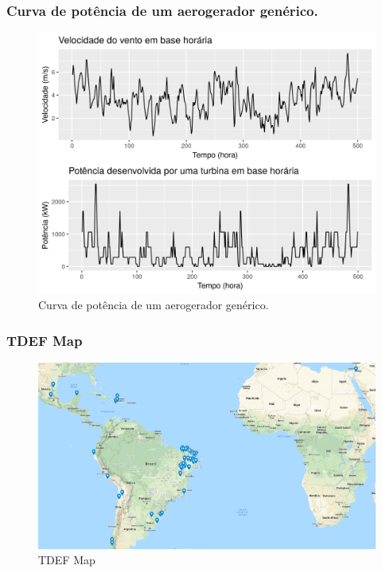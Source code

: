 \documentclass{beamer}
\begin{document}
\begin{frame}
	\frametitle{Curva de potência de um aerogerador genérico.}
	\begin{figure}
		\centering
		\includegraphics[width=\textwidth]{speed_power}
		\caption{Curva de potência de um aerogerador genérico.}
	\end{figure}
\end{frame}

\begin{frame}
	\frametitle{TDEF Map}
	\begin{figure}
		\centering
		\includegraphics[width=\textwidth]{latam}
		\caption{TDEF Map}
	\end{figure}
\end{frame}



%    
\end{document}

